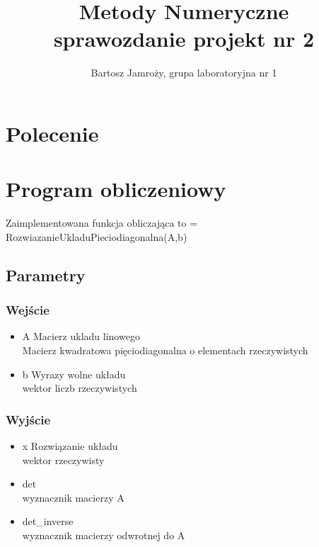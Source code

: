 \documentclass[11pt]{article}
\begin{document}

\title{Metody Numeryczne \\ sprawozdanie projekt nr 2 }
\author{Bartosz Jamroży, grupa laboratoryjna nr 1}
\maketitle


\section*{Polecenie}
\begin{center}
\end{center}


\newpage
\section*{Program obliczeniowy}
Zaimplementowana funkcja obliczająca to 
 = RozwiazanieUkladuPieciodiagonalna(A,b)
\subsection*{Parametry}
  \subsubsection*{Wejście}
    \begin{itemize}
    \item A Macierz ukladu linowego \\ 
    Macierz kwadratowa pięciodiagonalna o elementach rzeczywistych 
    \item b Wyrazy wolne układu\\
      wektor liczb rzeczywistych
    \end{itemize}
  
  \subsubsection*{Wyjście}
    \begin{itemize}
    \item x Rozwiązanie układu \\ 
    wektor rzeczywisty 
    \item det \\
      wyznacznik macierzy A
    \item det\_inverse \\
      wyznacznik macierzy odwrotnej do A  
    \end{itemize}
\end{document}
